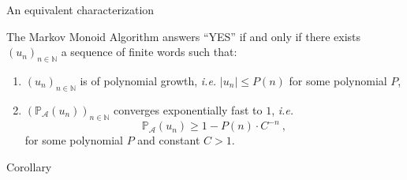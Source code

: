 \documentclass[svgnames]{beamer}
\renewcommand{\AA}{\mathcal{A}}
\newcommand{\NN}{\mathbb{N}}
\newcommand{\prob}[1]{\mathbb{P}_{#1}}
\begin{document}
\begin{frame}{An equivalent characterization}
\begin{theorem}
The Markov Monoid Algorithm answers ``YES'' if and only if
there exists $(u_n)_{n \in \NN}$ a sequence of finite words such that:
\begin{enumerate}
	\item $(u_n)_{n \in \NN}$ is of polynomial growth, \textit{i.e.} $|u_n| \le P(n)$ for some polynomial $P$,
	\item $(\prob{\AA}(u_n))_{n \in \NN}$ converges exponentially fast to $1$, \textit{i.e.} 
	$$\prob{\AA}(u_n) \ge 1 - P(n) \cdot C^{-n}\ ,$$
	for some polynomial $P$ and constant $C > 1$.
\end{enumerate}
\end{theorem}
\end{frame}

\begin{frame}{Corollary}
\begin{center}
\end{center}
\end{frame}
\end{document}
